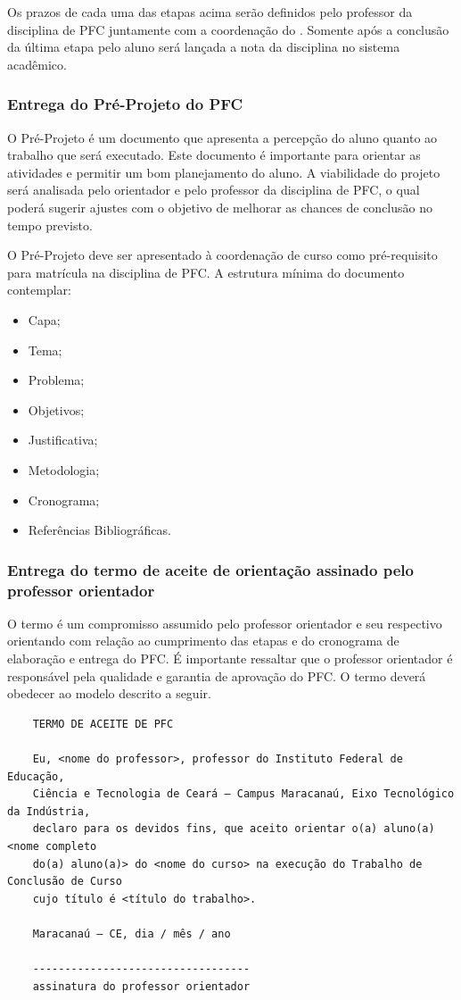 Os prazos de cada uma das etapas acima serão definidos pelo professor da disciplina de PFC juntamente com a coordenação
do \NOMECURSO. Somente após a conclusão da última etapa pelo aluno será lançada a nota da disciplina no sistema acadêmico.

\subsubsection{Entrega do Pré-Projeto do PFC}

O Pré-Projeto é um documento que apresenta a percepção do aluno quanto ao trabalho que será executado. Este documento é importante para orientar as atividades e permitir um bom planejamento do aluno. A viabilidade do projeto será analisada pelo orientador e pelo professor da disciplina de PFC, o qual poderá sugerir ajustes com o objetivo de melhorar as chances de conclusão no tempo previsto.

O Pré-Projeto deve ser apresentado à coordenação de curso como pré-requisito para matrícula na disciplina de PFC. A estrutura mínima do documento contemplar:

\begin{itemize}
	\item Capa;
	\item Tema;
	\item Problema;
	\item Objetivos;
	\item Justificativa;
	\item Metodologia;
	\item Cronograma;
	\item Referências Bibliográficas.
\end{itemize}

\subsubsection{Entrega do termo de aceite de orientação assinado pelo professor orientador}

O termo é um compromisso assumido pelo professor orientador e seu respectivo orientando com relação ao cumprimento das
etapas e do cronograma de elaboração e entrega do PFC. É importante ressaltar que o professor orientador é responsável
pela qualidade e garantia de aprovação do PFC. O termo deverá obedecer ao modelo descrito a seguir.

\begin{verbatim}
	TERMO DE ACEITE DE PFC
	
	Eu, <nome do professor>, professor do Instituto Federal de Educação,
	Ciência e Tecnologia de Ceará – Campus Maracanaú, Eixo Tecnológico da Indústria,
	declaro para os devidos fins, que aceito orientar o(a) aluno(a) <nome completo
	do(a) aluno(a)> do <nome do curso> na execução do Trabalho de Conclusão de Curso
	cujo título é <título do trabalho>.
	
	Maracanaú – CE, dia / mês / ano
	
	----------------------------------
	assinatura do professor orientador
	
\end{verbatim}

